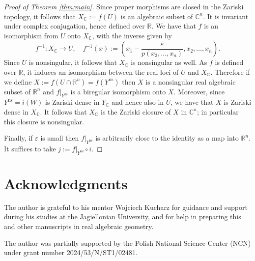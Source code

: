 \documentclass{amsart}
\theoremstyle{plain}
\theoremstyle{definition}
\theoremstyle{remark}
\numberwithin{equation}{thm} %
\newcommand{\R}{\mathbb{R}}
\newcommand{\C}{\mathbb{C}}
\newcommand{\ns}{\mathrm{ns}}
\begin{document}
\begin{proof}[Proof of Theorem \ref{thm:main}]
Since proper morphisms are closed in the Zariski topology, it follows that $X_\C:=f(U)$ is an algebraic subset of $\C^n$. It is invariant under complex conjugation, hence defined over $\R$. We have that $f$ is an isomorphism from $U$ onto $X_\C$, with the inverse given by
\begin{equation*}
    f^{-1}:X_\C \rightarrow U,\quad f^{-1}(x):=\left(x_1-\frac{\varepsilon}{p(x_2,\dots,x_n)},x_2,\dots,x_n\right).
\end{equation*}
Since $U$ is nonsingular, it follows that $X_\C$ is nonsingular as well. As $f$ is defined over $\R$, it induces an isomorphism between the real loci of $U$ and $X_\C$. Therefore if we define $X:=f(U\cap \R^n)=f(Y^\ns)$ then $X$ is a nonsingular real algebraic subset of $\R^n$ and $f\vert_{Y^\ns}$ is a biregular isomorphism onto $X$. Moreover, since $Y^\ns=i(W)$ is Zariski dense in $Y_\C$ and hence also in $U$, we have that $X$ is Zariski dense in $X_\C$. It follows that $X_\C$ is the Zariski closure of $X$ in $\C^n$; in particular this closure is nonsingular.

Finally, if $\varepsilon$ is small then $f\vert_{Y^\ns}$ is arbitrarily close to the identity as a map into $\R^n$. It suffices to take $j:=f\vert_{Y^\ns}\circ i$.
\end{proof}
\section*{Acknowledgments}
The author is grateful to his mentor Wojciech Kucharz for guidance and support during his studies at the Jagiellonian University, and for help in preparing this and other manuscripts in real algebraic geometry.

The author was partially supported by the Polish National Science Center (NCN) under grant number 2024/53/N/ST1/02481.


\printbibliography
\end{document}
